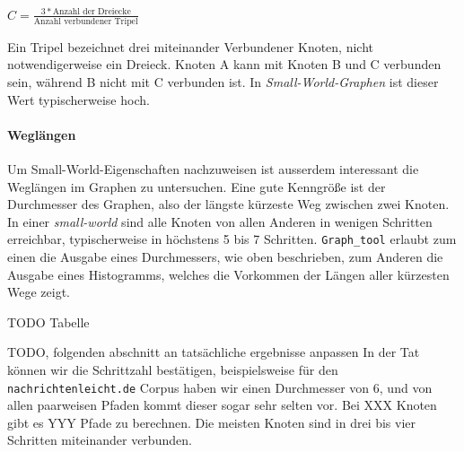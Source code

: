\documentclass[12pt]{article}
\begin{document}
\begin{center}
  \begin{math}
    C = \frac{3*\text{Anzahl der Dreiecke}}{\text{Anzahl verbundener Tripel}}
  \end{math}
\end{center}


Ein Tripel bezeichnet drei miteinander Verbundener Knoten, nicht notwendigerweise ein Dreieck. Knoten A kann mit Knoten B und C verbunden sein, während B nicht mit C verbunden ist. In \emph{Small-World-Graphen} ist dieser Wert typischerweise hoch. 




\paragraph{Wegl\"angen}
Um Small-World-Eigenschaften nachzuweisen ist ausserdem interessant die Weglängen im Graphen zu untersuchen. Eine gute Kenngröße ist der Durchmesser des Graphen, also der längste kürzeste Weg zwischen zwei Knoten. In einer \emph{small-world} sind alle Knoten von allen Anderen in wenigen Schritten erreichbar, typischerweise in höchstens 5 bis 7 Schritten. \texttt{Graph\_tool} erlaubt zum einen die Ausgabe eines Durchmessers, wie oben beschrieben, zum Anderen die Ausgabe eines Histogramms, welches die Vorkommen der Längen aller kürzesten Wege zeigt.

TODO Tabelle

TODO, folgenden abschnitt an tatsächliche ergebnisse anpassen
In der Tat können wir die Schrittzahl bestätigen, beispielsweise für den \texttt{nachrichtenleicht.de} Corpus haben wir einen Durchmesser von 6, und von allen paarweisen Pfaden kommt dieser sogar sehr selten vor. Bei XXX Knoten gibt es YYY Pfade zu berechnen. Die meisten Knoten sind in drei bis vier Schritten miteinander verbunden.
\end{document}
